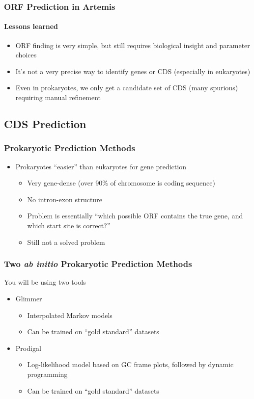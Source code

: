 \documentclass[table]{beamer}
\begin{document}
    \begin{frame}
      \frametitle{ORF Prediction in Artemis}   
      \framesubtitle{Lessons learned}   
      \begin{itemize}
        \item ORF finding is very simple, but still requires biological insight and parameter choices
        \item It's not a very precise way to identify genes or CDS (especially in eukaryotes)
        \item Even in prokaryotes, we only get a candidate set of CDS (many spurious) requiring manual refinement
      \end{itemize}
    \end{frame}

    \subsection{CDS Prediction}
    \begin{frame}
     \frametitle{Prokaryotic Prediction Methods}
     \begin{itemize}
       \item Prokaryotes ``easier'' than eukaryotes for gene prediction
       \begin{itemize}
         \item Very gene-dense (over 90\% of chromosome is coding sequence)
         \item No intron-exon structure
         \item Problem is essentially ``which possible ORF contains the true gene, and which start site is correct?''
         \item Still not a solved problem
       \end{itemize}       
     \end{itemize}
    \end{frame}

    \begin{frame}
     \frametitle{Two \textit{ab initio} Prokaryotic Prediction Methods}
     You will be using two tools
     \begin{itemize}
       \item Glimmer
       \begin{itemize}
         \item Interpolated Markov models
         \item Can be trained on ``gold standard'' datasets
       \end{itemize}
       \item Prodigal
       \begin{itemize}
         \item Log-likelihood model based on GC frame plots, followed by dynamic programming
         \item Can be trained on ``gold standard'' datasets
       \end{itemize}
     \end{itemize}
    \end{frame}
\end{document}
